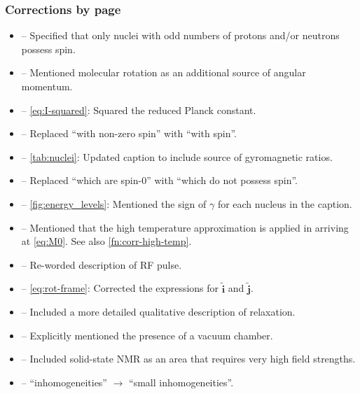 \documentclass[12pt]{article}
\begin{document}
    \subsubsection*{Corrections by page}
    \begin{itemize}
        \item {} -- Specified that only nuclei with odd
            numbers of protons and/or neutrons possess spin.
        \item {} -- Mentioned molecular rotation as
            an additional source of angular momentum.
        \item {} -- \cref{eq:I-squared}: Squared the
            reduced Planck constant.
        \item {} -- Replaced ``with non-zero spin'' with
            ``with spin''.
        \item {} -- \cref{tab:nuclei}: Updated caption to
            include source of gyromagnetic ratios.
        \item {} -- Replaced ``which are spin-0'' with ``which
            do not possess spin''.
        \item {} --  \cref{fig:energy_levels}:
            Mentioned the sign of $\gamma$ for each nucleus in the caption.
        \item {} --  Mentioned that the high temperature
            approximation is applied in arriving at \cref{eq:M0}. See also
            \cref{fn:corr-high-temp}.
        \item {} --  Re-worded description of RF pulse.
        \item {} -- \cref{eq:rot-frame}: Corrected the
            expressions for $\tilde{\symbf{i}}$ and $\tilde{\symbf{j}}$.
        \item {} -- Included a more detailed
            qualitative description of relaxation.
        \item {} -- Explicitly mentioned the presence of a
            vacuum chamber.
        \item {} -- Included solid-state NMR as an
            area that requires very high field strengths.
        \item {} -- ``inhomogeneities''
            $\rightarrow$ ``small inhomogeneities''.

\end{itemize}
\end{document}
